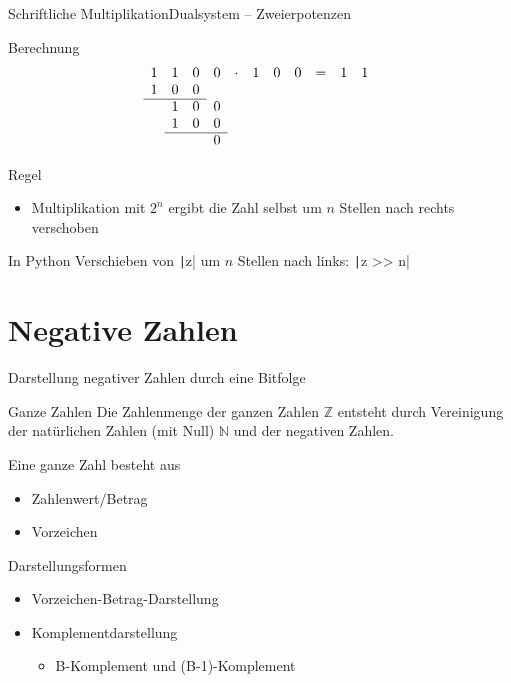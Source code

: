 \documentclass[xelatex,aspectratio=169]{beamer}
\begin{document}
\begin{frame}{Schriftliche Multiplikation}{Dualsystem -- Zweierpotenzen}
  \begin{block}{Berechnung}
    \[
      \begin{array}{ccccccccccccccccccc}
        1 & 1 & 0 & 0 & \cdot & 1 & 0 & 0 & = & 1 & 1 \\
        1 & 0 & 0 &   &       &   &   &               \\
        \cline{1-3}
          & 1 & 0 & 0 &       &   &   &               \\
          & 1 & 0 & 0 &       &   &   &               \\
        \cline{2-4}
          &   &   & 0 &       &   &   &               \\
      \end{array}
    \]
  \end{block}

  \begin{block}{Regel}
    \begin{itemize}
      \item Multiplikation mit $2^n$ ergibt die Zahl selbst um $n$ Stellen nach rechts verschoben
    \end{itemize}
  \end{block}

  \begin{exampleblock}{In Python}
    Verschieben von \texttt|z| um $n$ Stellen nach links: \texttt|z >> n|
  \end{exampleblock}
\end{frame}

\section{Negative Zahlen}

\begin{frame}{Darstellung negativer Zahlen durch eine Bitfolge}
  \begin{block}{Ganze Zahlen}
    Die Zahlenmenge der ganzen Zahlen $\mathbb{Z}$ entsteht durch Vereinigung der natürlichen Zahlen (mit Null) $\mathbb{N}$ und der negativen Zahlen.

    Eine ganze Zahl besteht aus
    \begin{itemize}
      \item Zahlenwert/Betrag
      \item Vorzeichen
    \end{itemize}
  \end{block}

  \begin{block}{Darstellungsformen}
    \begin{itemize}
      \item Vorzeichen-Betrag-Darstellung
      \item Komplementdarstellung
            \begin{itemize}
              \item B-Komplement und (B-1)-Komplement
            \end{itemize}
    \end{itemize}
  \end{block}
\end{frame}
\end{document}

